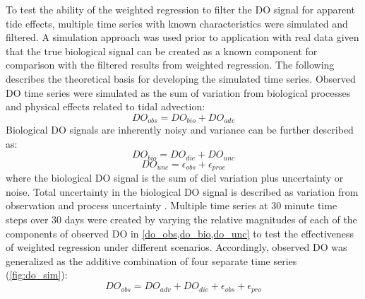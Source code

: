 \documentclass[letterpaper,12pt,oneside]{article}\usepackage[]{graphicx}\usepackage[]{color}
\begin{document}
To test the ability of the weighted regression to filter the \ac{DO} signal for apparent tide effects, multiple time series with known characteristics were simulated and filtered.  A simulation approach was used prior to application with real data given that the true biological signal can be created as a known component for comparison with the filtered results from weighted regression. The following describes the theoretical basis for developing the simulated time series.  Observed \ac{DO} time series were simulated as the sum of variation from biological processes and physical effects related to tidal advection:  
\begin{equation} \label{do_obs}
DO_{obs} = DO_{bio} + DO_{adv}
\end{equation}
Biological \ac{DO} signals are inherently noisy \citep{Batt12} and variance can be further described as:
\begin{equation} \label{do_bio} 
DO_{bio} = DO_{die} + DO_{unc}
\end{equation} 
\begin{equation} \label{do_unc}
DO_{unc} = \epsilon_{obs} + \epsilon_{proc}
\end{equation}
where the biological \ac{DO} signal is the sum of diel variation plus uncertainty or noise.  Total uncertainty in the biological \ac{DO} signal is described as variation from observation and process uncertainty \citep{Hilborn97}.  Multiple time series at 30 minute time steps over 30 days were created by varying the relative magnitudes of each of the components of observed \ac{DO} in \cref{do_obs,do_bio,do_unc} to test the effectiveness of weighted regression under different scenarios.  Accordingly, observed \ac{DO} was generalized as the additive combination of four separate time series (\cref{fig:do_sim}):
\begin{equation} \label{do_obs_all}
DO_{obs} = DO_{adv} + DO_{die} + \epsilon_{obs} + \epsilon_{pro}
\end{equation} 
\end{document}
